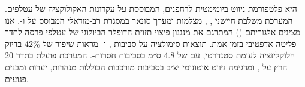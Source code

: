 

 היא פלטפורמת ניווט ביומימטית לרחפנים, המבוססת על עקרונות
האקולוקציה של עטלפים. המערכת משלבת חיישני , ,
מצלמות  ומערך סונאר  במסגרת  רב-מודאלי
המבוסס על  ו-. אנו מציגים אלגוריתם
 ()
המתרגם את מנגנון פיצוי תזוזת הדופלר הביולוגי של עטלפי-פרסה
לתדר פליטה אדפטיבי בזמן-אמת. תוצאות סימולציה על סביבות ,
 ו- מראות שיפור של 42\% בדיוק הלוקליזציה
לעומת  סטנדרטי, עם  של 4.8 ס״מ
בסביבות חסרות-. המערכת פועלת בתדר 20 הרץ על
, ומדגימה ניווט אוטונומי יציב
בסביבות מורכבות הכוללות מנהרות, יערות ומבנים פגועים.